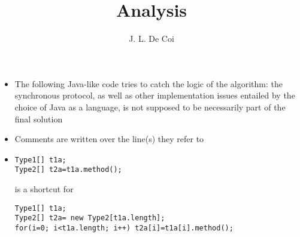 \documentclass{article}
\begin{document}
\title{Analysis}
\author{J. L. De Coi}
\maketitle

\begin{itemize}
	\item The following Java-like code tries to catch the logic of the algorithm: the synchronous protocol, as well as other implementation issues entailed by the choice of Java as a language, is not supposed to be necessarily part of the final solution
	\item Comments are written over the line(s) they refer to
	\item
\begin{verbatim}
Type1[] t1a;
Type2[] t2a=t1a.method();

\end{verbatim}
is a shortcut for
\begin{verbatim}
Type1[] t1a;
Type2[] t2a= new Type2[t1a.length];
for(i=0; i<t1a.length; i++) t2a[i]=t1a[i].method();
\end{verbatim}
\end{itemize}
\end{document}
